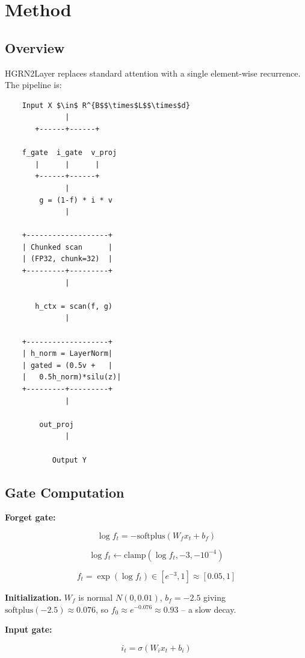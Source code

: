 \section{Method}

\subsection{Overview}

HGRN2Layer replaces standard attention with a single element-wise recurrence. 
The pipeline is:

\begin{lstlisting}
    Input X $\in$ R^{B$$\times$L$$\times$d}
              |
       +------+------+
                      
    f_gate  i_gate  v_proj
       |      |      |
       +------+------+
              |
        g = (1-f) * i * v
              |
               
    +-------------------+
    | Chunked scan      |
    | (FP32, chunk=32)  |
    +---------+---------+
              |
               
       h_ctx = scan(f, g)
              |
               
    +-------------------+
    | h_norm = LayerNorm|
    | gated = (0.5v +   |
    |   0.5h_norm)*silu(z)|
    +---------+---------+
              |
               
        out_proj
              |
               
           Output Y
\end{lstlisting}

\subsection{Gate Computation}

\textbf{Forget gate:}

\[
\log f_t = -\text{softplus}(W_f x_t + b_f)
\tag{4.1}
\]

\[
\log f_t \leftarrow \text{clamp}(\log f_t, -3, -10^{-4})
\tag{4.2}
\]

\[
f_t = \exp(\log f_t) \in [e^{-3}, 1] \approx [0.05, 1]
\tag{4.3}
\]

\textbf{Initialization.} $W_f$ is normal $N(0, 0.01)$, $b_f = -2.5$ giving 
$\text{softplus}(-2.5) \approx 0.076$, so $f_0 \approx e^{-0.076} \approx 0.93$ 
-- a slow decay.

\textbf{Input gate:}

\[
i_t = \sigma(W_i x_t + b_i)
\tag{4.4}
\]

